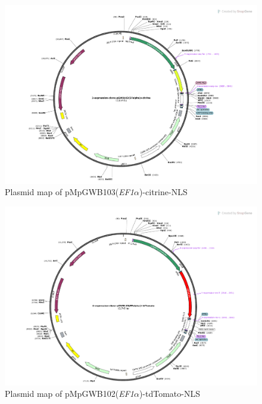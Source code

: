 \begin{figure}[htbp]
\centering
\includegraphics[width=1\textwidth]{Appendix2/Figs/3-expression-clone-pGWB103(EFalpha)+citrine Map.pdf}
\caption{Plasmid map of pMpGWB103(\textit{EF1$\alpha$})-citrine-NLS}
\label{fig:EFalpha_citrine_map}
\end{figure}

\begin{figure}[htbp]
\centering
\includegraphics[width=1\textwidth]{Appendix2/Figs/4-expression-clone-pGWB103(EFalpha)+tdTomato Map.pdf}
\caption{Plasmid map of pMpGWB102(\textit{EF1$\alpha$})-tdTomato-NLS}
\label{fig:EFalpha_tdTomato_map}
\end{figure}

